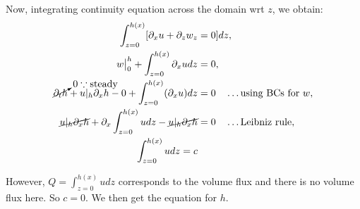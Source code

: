 \documentclass{article}
\begin{document}
% 
Now, integrating continuity equation across the domain wrt $z$, we obtain:
\begin{align}\label{eq:pendant_integrate_conti}
\begin{split}
 \int_{z=0}^{h(x)} [\partial_{x} u + \partial_{z} w_{z} &= 0 ] dz,\\
 w\big|_{0}^{h} + \int_{z=0}^{h(x)} \partial_{x} u dz &= 0,\\
 \cancelto{0 \because \textrm{steady}}{\partial_{t}h} + u|_{h} \partial_{x}h - 0 +  \int_{z=0}^{h(x)} (\partial_{x} u )dz &= 0 \quad \hdots \textrm{using BCs for } w, \\
 \cancel{u|_{h} \partial_{x}h} + \partial_{x} \int_{z=0}^{h(x)} u dz - \cancel{u|_{h} \partial_{x}h} &= 0 \quad \hdots \textrm{Leibniz rule},\\
 \int_{z=0}^{h(x)} u dz = c\\
\end{split}
\end{align}

However, $Q = \int_{z=0}^{h(x)} u dz$ corresponds to the volume flux and there is no volume flux here. So $c = 0$. We then get the equation for $h$.
\end{document}
